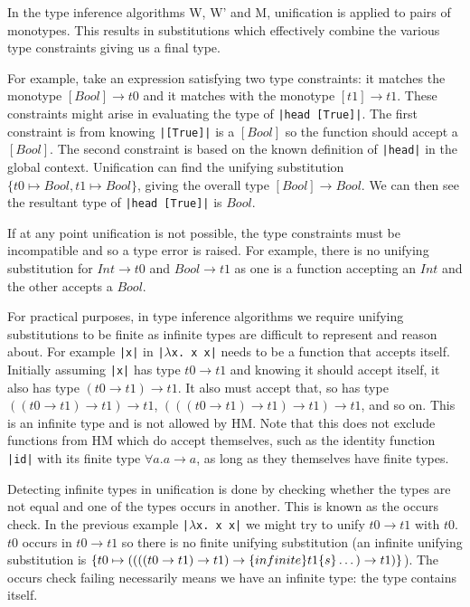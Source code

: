 \documentclass[a4paper,fleqn,12pt]{article}
\begin{document}
In the type inference algorithms W, W’ and M, unification is applied to pairs of monotypes. This results in substitutions which effectively combine the various type constraints giving us a final type.

For example, take an expression satisfying two type constraints: it matches the monotype $[Bool] \rightarrow t0$ and it matches with the monotype $[t1] \rightarrow t1$. These constraints might arise in evaluating the type of \texttt{|head [True]|}. The first constraint is from knowing \texttt{|[True]|} is a $[Bool]$ so the function should accept a $[Bool]$. The second constraint is based on the known definition of \texttt{|head|} in the global context. Unification can find the unifying substitution $\{ t0 \mapsto Bool, t1 \mapsto Bool \}$, giving the overall type $[Bool] \rightarrow Bool$. We can then see the resultant type of \texttt{|head [True]|} is $Bool$.

If at any point unification is not possible, the type constraints must be incompatible and so a type error is raised. For example, there is no unifying substitution for $Int \rightarrow t0$ and $Bool \rightarrow t1$ as one is a function accepting an $Int$ and the other accepts a $Bool$.

For practical purposes, in type inference algorithms we require unifying substitutions to be finite as infinite types are difficult to represent and reason about. For example \texttt{|x|} in \texttt{|$\lambda$x. x x|} needs to be a function that accepts itself. Initially assuming \texttt{|x|} has type $t0 \rightarrow t1$ and knowing it should accept itself, it also has type $(t0 \rightarrow t1) \rightarrow t1$. It also must accept that, so has type $((t0 \rightarrow t1) \rightarrow t1) \rightarrow t1$, $(((t0 \rightarrow t1) \rightarrow t1) \rightarrow t1) \rightarrow t1$, and so on. This is an infinite type and is not allowed by HM. Note that this does not exclude functions from HM which do accept themselves, such as the identity function \texttt{|id|} with its finite type $\forall a. a \rightarrow a$, as long as they themselves have finite types.

Detecting infinite types in unification is done by checking whether the types are not equal and one of the types occurs in another. This is known as the occurs check. In the previous example \texttt{|$\lambda$x. x x|} we might try to unify $t0 \rightarrow t1$ with $t0$. $t0$ occurs in $t0 \rightarrow t1$ so there is no finite unifying substitution (an infinite unifying substitution is $\{ t0 \mapsto ((((t0 \rightarrow t1) \rightarrow t1) \rightarrow \text\{infinite \}t1\text\{s\}\dots) \rightarrow t1) \}$). The occurs check failing necessarily means we have an infinite type: the type contains itself.
\end{document}
